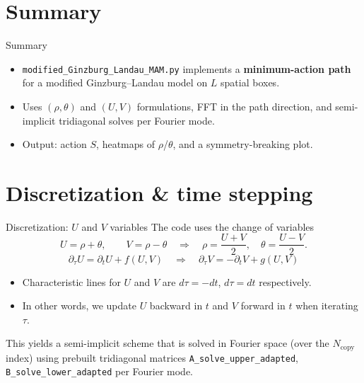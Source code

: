\documentclass{beamer}
\begin{document}
\section{Summary}
\begin{frame}{Summary}
    \begin{itemize}
        \item \texttt{modified\_Ginzburg\_Landau\_MAM.py} implements a \textbf{minimum-action path} for a modified Ginzburg--Landau model on $L$ spatial boxes.
        \item Uses $(\rho,\theta)$ and $(U,V)$ formulations, FFT in the path direction, and semi-implicit tridiagonal solves per Fourier mode.
        \item Output: action $S$, heatmaps of $\rho$/$\theta$, and a symmetry-breaking plot.
    \end{itemize}
\end{frame}

\section{Discretization \& time stepping}
\begin{frame}{Discretization: $U$ and $V$ variables}
    The code uses the change of variables
    \begin{equation}
        U = \rho + \theta, \qquad V = \rho - \theta
        \quad\Rightarrow\quad
        \rho = \frac{U+V}{2},\quad \theta = \frac{U-V}{2}.
    \end{equation}
    \begin{equation}
        \partial_\tau U = \partial_t U + f(U,V)
        \quad\Rightarrow\quad
        \partial_\tau V = -\partial_t V + g(U,V)
    \end{equation}
    \begin{itemize}
        \item Characteristic lines for $U$ and $V$ are $d\tau = -dt$, $d\tau = dt$ respectively. 
        \item In other words, we update $U$ backward in $t$ and $V$ forward in $t$ when iterating $\tau$.
    \end{itemize}
    This yields a semi-implicit scheme that is solved in Fourier space (over the $N_{\mathrm{copy}}$ index) using prebuilt tridiagonal matrices \texttt{A\_solve\_upper\_adapted}, \texttt{B\_solve\_lower\_adapted} per Fourier mode.
\end{frame}
\end{document}
